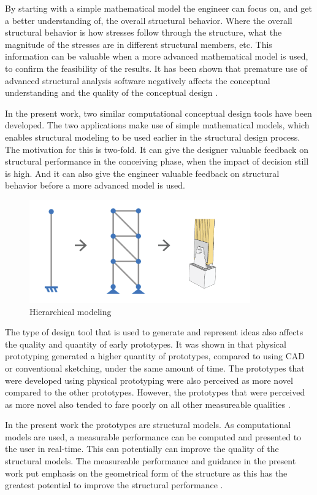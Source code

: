 By starting with a simple mathematical model the engineer can focus on, and get a better understanding of, the overall structural behavior. Where the overall structural behavior is how stresses follow through the structure, what the magnitude of the stresses are in different structural members, etc. This information can be valuable when a more advanced mathematical model is used, to confirm the feasibility of the results. It has been shown that premature use of advanced structural analysis software negatively affects the conceptual understanding and the quality of the conceptual design \cite{Froderberg2014}.

In the present work, two similar computational conceptual design tools have been developed. The two applications make use of simple mathematical models, which enables structural modeling to be used earlier in the structural design process. The motivation for this is two-fold. It can give the designer valuable feedback on structural performance in the conceiving phase, when the impact of decision still is high. And it can also give the engineer valuable feedback on structural behavior before a more advanced model is used. 

\begin{figure}
  \includegraphics[width=270pt]{graphics/hiarchical-modelling.png}
  \caption{Hierarchical modeling}
  \label{fig:hiarchical-modelling}
\end{figure}

The type of design tool that is used to generate and represent ideas also affects the quality and quantity of early prototypes. It was shown in \cite{Haggman2015} that physical prototyping generated a higher quantity of prototypes, compared to using CAD or conventional sketching, under the same amount of time. The prototypes that were developed using physical prototyping were also perceived as more novel compared to the other prototypes. However, the prototypes that were perceived as more novel also tended to fare poorly on all other measureable qualities \cite{Haggman2015}. 

In the present work the prototypes are structural models. As computational models are used, a measurable performance can be computed and presented to the user in real-time. This can potentially can improve the quality of the structural models. The measureable performance and guidance in the present work put emphasis on the geometrical form of the structure as this has the greatest potential to improve the structural performance \cite{Mueller2014}. 

